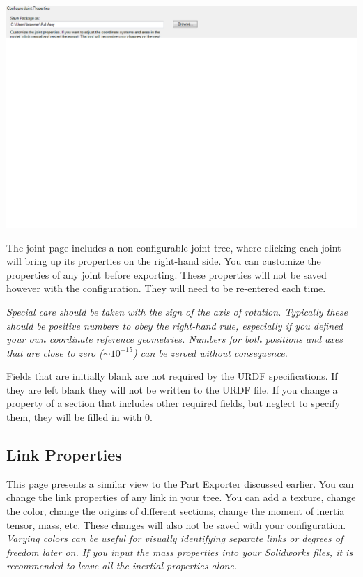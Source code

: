 \includegraphics[width=\textwidth]{images/ExportJointProperties}

The joint page includes a non-configurable joint tree, where clicking each joint will bring up its properties on the right-hand side. You can customize the properties of any joint before exporting.  These properties will not be saved however with the configuration. They will need to be re-entered each time.

\emph{Special care should be taken with the sign of the axis of rotation.  Typically these should be positive numbers to obey the right-hand rule, especially if you defined your own coordinate reference geometries.  Numbers for both positions and axes that are close to zero ($\sim10^{-15}$) can be zeroed without consequence.}

Fields that are initially blank are not required by the URDF specifications. If they are left blank they will not be written to the URDF file. If you change a property of a section that includes other required fields, but neglect to specify them, they will be filled in with 0.

\subsection{Link Properties}
\indent This page presents a similar view to the Part Exporter discussed earlier. You can change the link properties of any link in your tree. You can add a texture, change the color, change the origins of different sections, change the moment of inertia tensor, mass, etc. These changes will also not be saved with your configuration. \emph{Varying colors can be useful for visually identifying separate links or degrees of freedom later on.  If you input the mass properties into your Solidworks files, it is recommended to leave all the inertial properties alone.}

